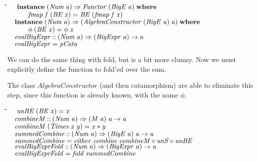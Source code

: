 \documentclass[10pt]{article}
\newlength{\lwidth}\setlength{\lwidth}{4.5cm}
\newlength{\cwidth}\setlength{\cwidth}{8mm} %
\newcommand{\Conid}[1]{\mathit{#1}}
\newcommand{\Varid}[1]{\mathit{#1}}
\begin{document}
\begin{tabbing}
\qquad\=\hspace{\lwidth}\=\hspace{\cwidth}\=\+\kill
${\hskip1.00em\relax\mathbf{instance}\;(\Conid{Num}\;\Varid{a})\Rightarrow \Conid{Functor}\;(\Conid{BigE}\;\Varid{a})\;\mathbf{where}}$\\
${\hskip1.00em\relax\hskip2.00em\relax\Varid{fmap}\;\Varid{f}\;(\Conid{BE}\;\Varid{x})\mathrel{=}\Conid{BE}\;(\Varid{fmap}\;\Varid{f}\;\Varid{x})}$\\
${}$\\
${\hskip1.00em\relax\mathbf{instance}\;(\Conid{Num}\;\Varid{a})\Rightarrow (\Conid{AlgebraConstructor}\;(\Conid{BigE}\;\Varid{a})\;\Varid{a})\;\mathbf{where}}$\\
${\hskip1.00em\relax\hskip2.00em\relax\Varid{\phi}\;(\Conid{BE}\;\Varid{x})\mathrel{=}\Varid{\phi}\;\Varid{x}}$\\
${}$\\
${\hskip1.00em\relax\Varid{evalBigExpr}\mathbin{::}(\Conid{Num}\;\Varid{a})\Rightarrow (\Conid{BigExpr}\;\Varid{a})\to \Varid{a}}$\\
${\hskip1.00em\relax\Varid{evalBigExpr}\mathrel{=}\Varid{pCata}}$
\end{tabbing}
We can do the same thing with fold, but is a bit more clumsy.
Now we must explicitly define the function to fold'ed over the sum.

The class \ensuremath{\Conid{AlgebraConstructor}} (and then catamorphism) are able to
eliminate this step, since this function is already known,
with the name \ensuremath{\Varid{\phi}}.

\begin{tabbing}
\qquad\=\hspace{\lwidth}\=\hspace{\cwidth}\=\+\kill
${\hskip1.00em\relax\Varid{unBE}\;(\Conid{BE}\;\Varid{x})\mathrel{=}\Varid{x}}$\\
${}$\\
${\hskip1.00em\relax\Varid{combineM}\mathbin{::}(\Conid{Num}\;\Varid{a})\Rightarrow (\Conid{M}\;\Varid{a})\;\Varid{a}\to \Varid{a}}$\\
${\hskip1.00em\relax\Varid{combineM}\;(\Conid{Times}\;\Varid{x}\;\Varid{y})\mathrel{=}\Varid{x}\mathbin{*}\Varid{y}}$\\
${}$\\
${\hskip1.00em\relax\Varid{summedCombine}\mathbin{::}(\Conid{Num}\;\Varid{a})\Rightarrow (\Conid{BigE}\;\Varid{a})\;\Varid{a}\to \Varid{a}}$\\
${\hskip1.00em\relax\Varid{summedCombine}\mathrel{=}\Varid{either}\;\Varid{combine}\;\Varid{combineM}\mathbin{\circ}\Varid{unS}\mathbin{\circ}\Varid{unBE}}$\\
${}$\\
${\hskip1.00em\relax\Varid{evalBigExprFold}\mathbin{::}(\Conid{Num}\;\Varid{a})\Rightarrow (\Conid{BigExpr}\;\Varid{a})\to \Varid{a}}$\\
${\hskip1.00em\relax\Varid{evalBigExprFold}\mathrel{=}\Varid{fold}\;\Varid{summedCombine}}$
\end{tabbing}
\end{document}
